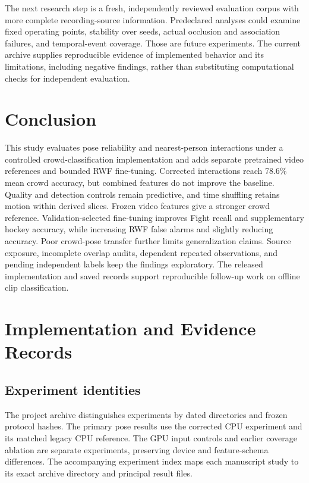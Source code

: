 \documentclass[journal]{IEEEtai}
\begin{document}
The next research step is a fresh, independently reviewed evaluation corpus with more complete recording-source information. Predeclared analyses could examine fixed operating points, stability over seeds, actual occlusion and association failures, and temporal-event coverage. Those are future experiments. The current archive supplies reproducible evidence of implemented behavior and its limitations, including negative findings, rather than substituting computational checks for independent evaluation.



\section{Conclusion}
This study evaluates pose reliability and nearest-person interactions under a controlled crowd-classification implementation and adds separate pretrained video references and bounded RWF fine-tuning. Corrected interactions reach 78.6\% mean crowd accuracy, but combined features do not improve the baseline. Quality and detection controls remain predictive, and time shuffling retains motion within derived slices. Frozen video features give a stronger crowd reference. Validation-selected fine-tuning improves Fight recall and supplementary hockey accuracy, while increasing RWF false alarms and slightly reducing accuracy. Poor crowd-pose transfer further limits generalization claims. Source exposure, incomplete overlap audits, dependent repeated observations, and pending independent labels keep the findings exploratory. The released implementation and saved records support reproducible follow-up work on offline clip classification.


\appendices

\section{Implementation and Evidence Records}
\subsection{Experiment identities}
The project archive distinguishes experiments by dated directories and frozen protocol hashes. The primary pose results use the corrected CPU experiment and its matched legacy CPU reference. The GPU input controls and earlier coverage ablation are separate experiments, preserving device and feature-schema differences. The accompanying experiment index maps each manuscript study to its exact archive directory and principal result files.
\end{document}
